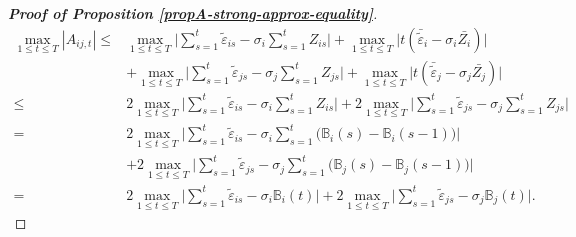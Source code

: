\documentclass[a4paper,12pt]{article}
\begin{document}
\begin{proof}[\textnormal{\textbf{Proof of Proposition \ref{propA-strong-approx-equality}}}]
\begin{align*}
\max_{1 \le t \le T} |A_{ij, t}|   \le & \max_{1 \le t \le T} \Big| \sum\limits_{s=1}^t \widetilde{\varepsilon}_{is} -{\sigma}_i \sum\limits_{s=1}^t Z_{is} \Big| + \max_{1 \le t \le T} \Big| t (\bar{\widetilde{\varepsilon}}_{i} - {\sigma}_i \bar{Z_i}) \Big|\\
& + \max_{1 \le t \le T} \Big| \sum\limits_{s=1}^t \widetilde{\varepsilon}_{js} - {\sigma}_j \sum\limits_{s=1}^t Z_{js} \Big| + \max_{1 \le t \le T} \Big| t (\bar{\widetilde{\varepsilon}}_{j} -{\sigma}_j \bar{Z_j}) \Big| \\
\le & 2 \max_{1 \le t \le T} \Big| \sum\limits_{s=1}^t \widetilde{\varepsilon}_{is} -{\sigma}_i \sum\limits_{s=1}^t Z_{is} \Big| + 2 \max_{1 \le t \le T} \Big| \sum\limits_{s=1}^t \widetilde{\varepsilon}_{js} -{\sigma}_j \sum\limits_{s=1}^t Z_{js} \Big| \\
= & 2 \max_{1 \le t \le T} \Big| \sum\limits_{s=1}^t \widetilde{\varepsilon}_{is} - {\sigma}_i \sum\limits_{s=1}^t \big(\mathbb{B}_{i}(s) - \mathbb{B}_{i}(s-1) \big) \Big| \\
& +  2 \max_{1 \le t \le T} \Big| \sum\limits_{s=1}^t \widetilde{\varepsilon}_{js} -{\sigma}_j \sum\limits_{s=1}^t \big(\mathbb{B}_{j}(s) - \mathbb{B}_{j}(s-1) \big) \Big|\\
= & 2 \max_{1 \le t \le T} \Big| \sum\limits_{s=1}^t \widetilde{\varepsilon}_{is} - {\sigma}_i \mathbb{B}_{i}(t) \Big| + 2 \max_{1 \le t \le T} \Big| \sum\limits_{s=1}^t \widetilde{\varepsilon}_{js} - {\sigma}_j \mathbb{B}_{j}(t) \Big|.
\end{align*}


\end{proof}
\end{document}
